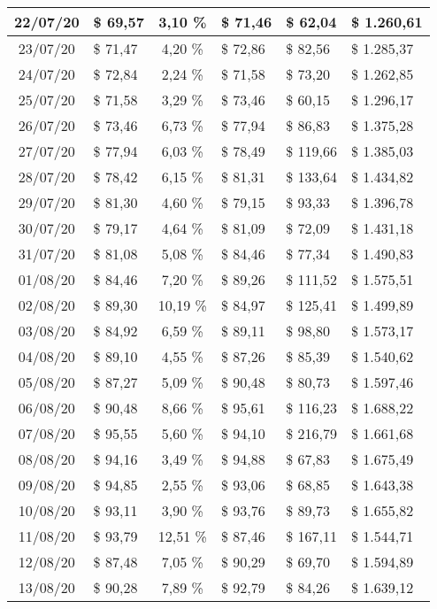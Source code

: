 \begin{center}
\begin{small}
\begin{longtable}{|c|l|c|l|l|l|}
22/07/20 & \$ 69,57 & 3,10 \% & \$ 71,46 & \$ 62,04 & \$ 1.260,61 \\ \hline
23/07/20 & \$ 71,47 & 4,20 \% & \$ 72,86 & \$ 82,56 & \$ 1.285,37 \\ \hline
24/07/20 & \$ 72,84 & 2,24 \% & \$ 71,58 & \$ 73,20 & \$ 1.262,85 \\ \hline
25/07/20 & \$ 71,58 & 3,29 \% & \$ 73,46 & \$ 60,15 & \$ 1.296,17 \\ \hline
26/07/20 & \$ 73,46 & 6,73 \% & \$ 77,94 & \$ 86,83 & \$ 1.375,28 \\ \hline
27/07/20 & \$ 77,94 & 6,03 \% & \$ 78,49 & \$ 119,66 & \$ 1.385,03 \\ \hline
28/07/20 & \$ 78,42 & 6,15 \% & \$ 81,31 & \$ 133,64 & \$ 1.434,82 \\ \hline
29/07/20 & \$ 81,30 & 4,60 \% & \$ 79,15 & \$ 93,33 & \$ 1.396,78 \\ \hline
30/07/20 & \$ 79,17 & 4,64 \% & \$ 81,09 & \$ 72,09 & \$ 1.431,18 \\ \hline
31/07/20 & \$ 81,08 & 5,08 \% & \$ 84,46 & \$ 77,34 & \$ 1.490,83 \\ \hline
01/08/20 & \$ 84,46 & 7,20 \% & \$ 89,26 & \$ 111,52 & \$ 1.575,51 \\ \hline
02/08/20 & \$ 89,30 & 10,19 \% & \$ 84,97 & \$ 125,41 & \$ 1.499,89 \\ \hline
03/08/20 & \$ 84,92 & 6,59 \% & \$ 89,11 & \$ 98,80 & \$ 1.573,17 \\ \hline
04/08/20 & \$ 89,10 & 4,55 \% & \$ 87,26 & \$ 85,39 & \$ 1.540,62 \\ \hline
05/08/20 & \$ 87,27 & 5,09 \% & \$ 90,48 & \$ 80,73 & \$ 1.597,46 \\ \hline
06/08/20 & \$ 90,48 & 8,66 \% & \$ 95,61 & \$ 116,23 & \$ 1.688,22 \\ \hline
07/08/20 & \$ 95,55 & 5,60 \% & \$ 94,10 & \$ 216,79 & \$ 1.661,68 \\ \hline
08/08/20 & \$ 94,16 & 3,49 \% & \$ 94,88 & \$ 67,83 & \$ 1.675,49 \\ \hline
09/08/20 & \$ 94,85 & 2,55 \% & \$ 93,06 & \$ 68,85 & \$ 1.643,38 \\ \hline
10/08/20 & \$ 93,11 & 3,90 \% & \$ 93,76 & \$ 89,73 & \$ 1.655,82 \\ \hline
11/08/20 & \$ 93,79 & 12,51 \% & \$ 87,46 & \$ 167,11 & \$ 1.544,71 \\ \hline
12/08/20 & \$ 87,48 & 7,05 \% & \$ 90,29 & \$ 69,70 & \$ 1.594,89 \\ \hline
13/08/20 & \$ 90,28 & 7,89 \% & \$ 92,79 & \$ 84,26 & \$ 1.639,12 \\ \hline

\end{longtable}
\end{small}
\end{center}
